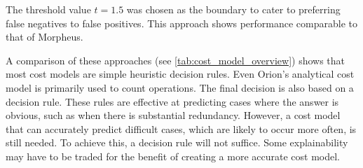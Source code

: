 The threshold value $t = 1.5 $ was chosen as the boundary to cater to preferring false negatives to false positives. This approach shows performance comparable to that of Morpheus.

A comparison of these approaches (see \autoref{tab:cost_model_overview}) shows that most cost models are simple heuristic decision rules. Even Orion's analytical cost model is primarily used to count operations. The final decision is also based on a decision rule. These rules are effective at predicting cases where the answer is obvious, such as when there is substantial redundancy. However, a cost model that can accurately predict difficult cases, which are likely to occur more often, is still needed. To achieve this, a decision rule will not suffice. Some explainability may have to be traded for the benefit of creating a more accurate cost model.

